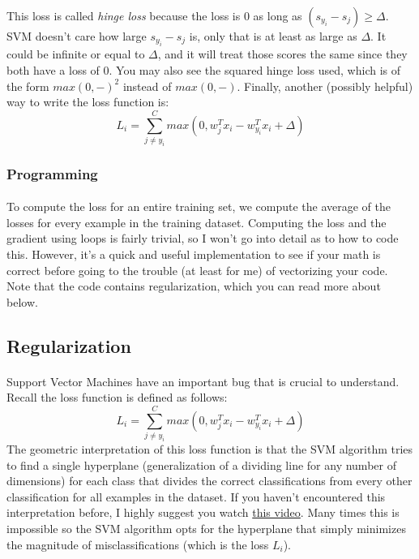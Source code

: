 \documentclass[12pt]{article}
\begin{document}
This loss is called \emph{hinge loss} because the loss is 0 as long as 
$(s_{y_i} - s_j) \geq \Delta$. SVM doesn't care how large $s_{y_i} - s_j$ is, 
only that is at least as large as $\Delta$. It could be infinite or equal to $\Delta$,
and it will treat those scores the same since they both have a loss of 0. You may 
also see the squared hinge loss used, which is of the form $max(0, -)^2$ instead 
of $max(0, -)$. Finally, another (possibly helpful) way to write the loss function is: 
\begin{equation}
    L_{i} = \sum_{j \neq y_{i}}^C max(0, w_{j}^T x_i - w_{y_i}^T x_i + \Delta)
\end{equation}

\subsubsection{Programming}

\paragraph{}
To compute the loss for an entire training set, we compute the average of the losses
for every example in the training dataset. Computing the loss and the gradient using loops is
fairly trivial, so I won't go into detail as to how to code this. However, it's a quick 
and useful implementation to see if your math is correct before going to the trouble
(at least for me) of vectorizing your code. Note that the code contains regularization, 
which you can read more about below. 
\paragraph{}

\subsection{Regularization}

\paragraph{}
Support Vector Machines have an important bug that is crucial to understand. Recall the 
loss function is defined as follows: 
\begin{equation}
    L_{i} = \sum_{j \neq y_{i}}^C max(0, w_{j}^T x_i - w_{y_i}^T x_i + \Delta)
\end{equation}
The geometric interpretation of this loss function is that the SVM algorithm tries to find a single 
hyperplane (generalization of a dividing line for any number of dimensions) 
for each class that divides the correct classifications from every other 
classification for all examples in the dataset. If you haven't encountered this 
interpretation before, I highly suggest you watch \href{https://www.youtube.com/watch?v=efR1C6CvhmE}{this video}. 
Many times this is impossible so the SVM algorithm opts for the hyperplane that 
simply minimizes the magnitude of misclassifications (which is the loss $L_i$). 
\end{document}
